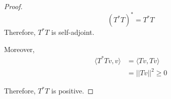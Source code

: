 \documentclass[12pt]{book}
\begin{document}
\begin{proof}
  \[
  (T^{*}T)^* = T^*T
  \]
  Therefore, $T^{*}T$ is self-adjoint.

  Moreover,
  \begin{align*}
    \langle T^{*}Tv, v \rangle & = \langle Tv, Tv \rangle\\
    & = ||Tv||^2 \ge 0
  \end{align*}

Therefore, $T^{*}T$ is positive. 
\end{proof}

\end{document}
